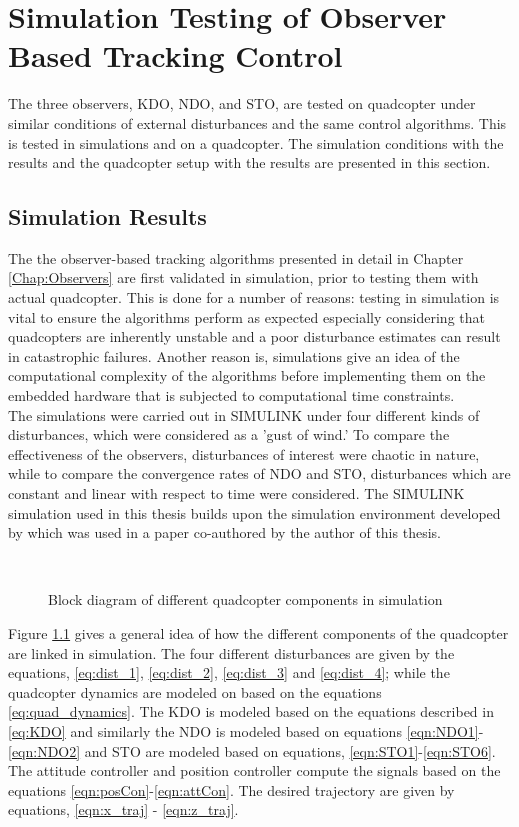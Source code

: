 \documentclass[letterpaper%
, twoside%
, 12pt%
,memoire%
, english%
,creativecommons,hyperref%
]{thETS}
\begin{document}
\chapter{Simulation Testing of Observer Based Tracking Control} \label{Chap:ResultsSim}
The three observers, KDO, NDO, and STO, are tested on quadcopter under similar conditions of external disturbances and the same control algorithms. This is tested in simulations and on a quadcopter. The simulation conditions with the results and the quadcopter setup with the results are presented in this section. 

\section{Simulation Results} \label{section:SimulationResults}
The the observer-based tracking algorithms presented in detail in Chapter \ref{Chap:Observers} are first validated in simulation, prior to testing them with actual quadcopter. This is done for a number of reasons: testing in simulation is vital to ensure the algorithms perform as expected especially considering that quadcopters are inherently unstable and a poor disturbance estimates can result in catastrophic failures. Another reason is, simulations give an idea of the computational complexity of the algorithms before implementing them on the embedded hardware that is subjected to computational time constraints. \\
The simulations were carried out in SIMULINK under four different kinds of disturbances, which were considered as a 'gust of wind.' To compare the effectiveness of the observers, disturbances of interest were chaotic in nature, while to compare the convergence rates of NDO and STO, disturbances which are constant and linear with respect to time were considered. 
The SIMULINK simulation used in this thesis builds upon the simulation environment developed by \citep{nuradeen2019thesis} which was used in a paper co-authored by the author of this thesis. 
\begin{figure}[H]
	\centering
	\resizebox{0.85\textwidth}{!}{\fbox{}}
	 \\ \parbox{0.95\textwidth}{\caption{Block diagram of different quadcopter components in simulation \label{Fig:block_simulation}}}
\end{figure}

Figure \ref{Fig:block_simulation} gives a general idea of how the different components of the quadcopter are linked in simulation. The four different disturbances are given by the equations, \eqref{eq:dist_1}, \eqref{eq:dist_2}, \eqref{eq:dist_3} and \eqref{eq:dist_4}; while the quadcopter dynamics are modeled on based on the equations \eqref{eq:quad_dynamics}. The KDO is modeled based on the equations described in \eqref{eq:KDO} and similarly the NDO is modeled based on equations \eqref{eqn:NDO1}-\eqref{eqn:NDO2} and STO are modeled based on equations, \eqref{eqn:STO1}-\eqref{eqn:STO6}. The attitude controller and position controller compute the signals based on the equations \eqref{eqn:posCon}-\eqref{eqn:attCon}. The desired trajectory are given by equations, \eqref{eqn:x_traj} - \eqref{eqn:z_traj}. 
\end{document}
